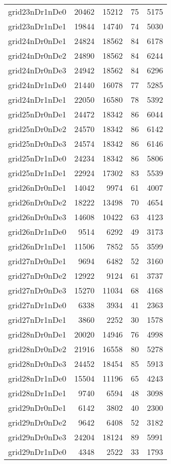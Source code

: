 \begin{longtable}{lrrrr}
grid23nDr1nDe0 & 20462 & 15212 & 75 & 5175 \\
grid23nDr1nDe1 & 19844 & 14740 & 74 & 5030 \\
grid24nDr0nDe1 & 24824 & 18562 & 84 & 6178 \\
grid24nDr0nDe2 & 24890 & 18562 & 84 & 6244 \\
grid24nDr0nDe3 & 24942 & 18562 & 84 & 6296 \\
grid24nDr1nDe0 & 21440 & 16078 & 77 & 5285 \\
grid24nDr1nDe1 & 22050 & 16580 & 78 & 5392 \\
grid25nDr0nDe1 & 24472 & 18342 & 86 & 6044 \\
grid25nDr0nDe2 & 24570 & 18342 & 86 & 6142 \\
grid25nDr0nDe3 & 24574 & 18342 & 86 & 6146 \\
grid25nDr1nDe0 & 24234 & 18342 & 86 & 5806 \\
grid25nDr1nDe1 & 22924 & 17302 & 83 & 5539 \\
grid26nDr0nDe1 & 14042 & 9974 & 61 & 4007 \\
grid26nDr0nDe2 & 18222 & 13498 & 70 & 4654 \\
grid26nDr0nDe3 & 14608 & 10422 & 63 & 4123 \\
grid26nDr1nDe0 & 9514 & 6292 & 49 & 3173 \\
grid26nDr1nDe1 & 11506 & 7852 & 55 & 3599 \\
grid27nDr0nDe1 & 9694 & 6482 & 52 & 3160 \\
grid27nDr0nDe2 & 12922 & 9124 & 61 & 3737 \\
grid27nDr0nDe3 & 15270 & 11034 & 68 & 4168 \\
grid27nDr1nDe0 & 6338 & 3934 & 41 & 2363 \\
grid27nDr1nDe1 & 3860 & 2252 & 30 & 1578 \\
grid28nDr0nDe1 & 20020 & 14946 & 76 & 4998 \\
grid28nDr0nDe2 & 21916 & 16558 & 80 & 5278 \\
grid28nDr0nDe3 & 24452 & 18454 & 85 & 5913 \\
grid28nDr1nDe0 & 15504 & 11196 & 65 & 4243 \\
grid28nDr1nDe1 & 9740 & 6594 & 48 & 3098 \\
grid29nDr0nDe1 & 6142 & 3802 & 40 & 2300 \\
grid29nDr0nDe2 & 9642 & 6408 & 52 & 3182 \\
grid29nDr0nDe3 & 24204 & 18124 & 89 & 5991 \\
grid29nDr1nDe0 & 4348 & 2522 & 33 & 1793 \\

\end{longtable}
